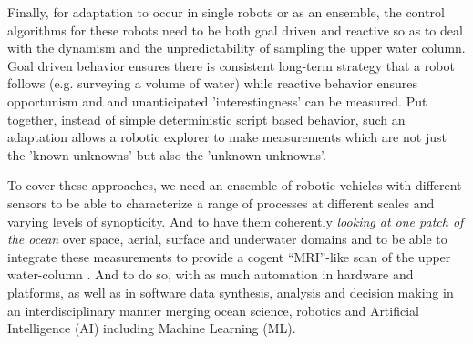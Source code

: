 Finally, for adaptation to occur in single robots or as an ensemble,
the control algorithms for these robots need to be both goal driven
and reactive so as to deal with the dynamism and the unpredictability
of sampling the upper water column. Goal driven behavior ensures there
is consistent long-term strategy that a robot follows (e.g. surveying
a volume of water) while reactive behavior ensures opportunism and and
unanticipated 'interestingness' can be measured. Put together, instead
of simple deterministic script based behavior, such an adaptation
allows a robotic explorer to make measurements which are not just the
'known unknowns' but also the 'unknown unknowns'.

To cover these approaches, we need an ensemble of robotic vehicles
with different sensors to be able to characterize a range of processes
at different scales and varying levels of synopticity. And to have
them coherently \emph{looking at one patch of the ocean} over space,
aerial, surface and underwater domains and to be able to integrate
these measurements to provide a cogent ``MRI''-like scan of the upper
water-column . And to do so, with as much automation in hardware and
platforms, as well as in software data synthesis, analysis and
decision making in an interdisciplinary manner merging ocean science,
robotics and Artificial Intelligence (AI) including Machine Learning
(ML).


